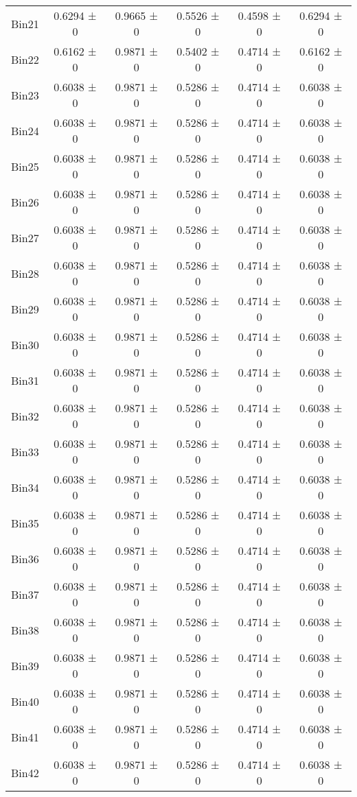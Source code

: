 \begin{tabular}{@{\extracolsep{4pt}}lccccc@{}}
     Bin21 & 0.6294 ± 0 & 0.9665 ± 0 & 0.5526 ± 0 & 0.4598 ± 0 & 0.6294 ± 0 \\ 
     Bin22 & 0.6162 ± 0 & 0.9871 ± 0 & 0.5402 ± 0 & 0.4714 ± 0 & 0.6162 ± 0 \\ 
     Bin23 & 0.6038 ± 0 & 0.9871 ± 0 & 0.5286 ± 0 & 0.4714 ± 0 & 0.6038 ± 0 \\ 
     Bin24 & 0.6038 ± 0 & 0.9871 ± 0 & 0.5286 ± 0 & 0.4714 ± 0 & 0.6038 ± 0 \\ 
     Bin25 & 0.6038 ± 0 & 0.9871 ± 0 & 0.5286 ± 0 & 0.4714 ± 0 & 0.6038 ± 0 \\ 
     Bin26 & 0.6038 ± 0 & 0.9871 ± 0 & 0.5286 ± 0 & 0.4714 ± 0 & 0.6038 ± 0 \\ 
     Bin27 & 0.6038 ± 0 & 0.9871 ± 0 & 0.5286 ± 0 & 0.4714 ± 0 & 0.6038 ± 0 \\ 
     Bin28 & 0.6038 ± 0 & 0.9871 ± 0 & 0.5286 ± 0 & 0.4714 ± 0 & 0.6038 ± 0 \\ 
     Bin29 & 0.6038 ± 0 & 0.9871 ± 0 & 0.5286 ± 0 & 0.4714 ± 0 & 0.6038 ± 0 \\ 
     Bin30 & 0.6038 ± 0 & 0.9871 ± 0 & 0.5286 ± 0 & 0.4714 ± 0 & 0.6038 ± 0 \\ 
     Bin31 & 0.6038 ± 0 & 0.9871 ± 0 & 0.5286 ± 0 & 0.4714 ± 0 & 0.6038 ± 0 \\ 
     Bin32 & 0.6038 ± 0 & 0.9871 ± 0 & 0.5286 ± 0 & 0.4714 ± 0 & 0.6038 ± 0 \\ 
     Bin33 & 0.6038 ± 0 & 0.9871 ± 0 & 0.5286 ± 0 & 0.4714 ± 0 & 0.6038 ± 0 \\ 
     Bin34 & 0.6038 ± 0 & 0.9871 ± 0 & 0.5286 ± 0 & 0.4714 ± 0 & 0.6038 ± 0 \\ 
     Bin35 & 0.6038 ± 0 & 0.9871 ± 0 & 0.5286 ± 0 & 0.4714 ± 0 & 0.6038 ± 0 \\ 
     Bin36 & 0.6038 ± 0 & 0.9871 ± 0 & 0.5286 ± 0 & 0.4714 ± 0 & 0.6038 ± 0 \\ 
     Bin37 & 0.6038 ± 0 & 0.9871 ± 0 & 0.5286 ± 0 & 0.4714 ± 0 & 0.6038 ± 0 \\ 
     Bin38 & 0.6038 ± 0 & 0.9871 ± 0 & 0.5286 ± 0 & 0.4714 ± 0 & 0.6038 ± 0 \\ 
     Bin39 & 0.6038 ± 0 & 0.9871 ± 0 & 0.5286 ± 0 & 0.4714 ± 0 & 0.6038 ± 0 \\ 
     Bin40 & 0.6038 ± 0 & 0.9871 ± 0 & 0.5286 ± 0 & 0.4714 ± 0 & 0.6038 ± 0 \\ 
     Bin41 & 0.6038 ± 0 & 0.9871 ± 0 & 0.5286 ± 0 & 0.4714 ± 0 & 0.6038 ± 0 \\ 
     Bin42 & 0.6038 ± 0 & 0.9871 ± 0 & 0.5286 ± 0 & 0.4714 ± 0 & 0.6038 ± 0 \\ 

\end{tabular}
